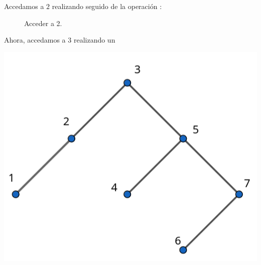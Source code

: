 Accedamos a $2$ realizando  seguido de la operación :
\begin{center}
  \begin{figure}[h]
    \centering
    \caption*{Acceder a 2.}
    \label{f:animales}
  \end{figure}


\end{center}

Ahora, accedamos a $3$ realizando un 

\begin{center}
  \includegraphics[scale=0.3]{./04.png}
\end{center}

